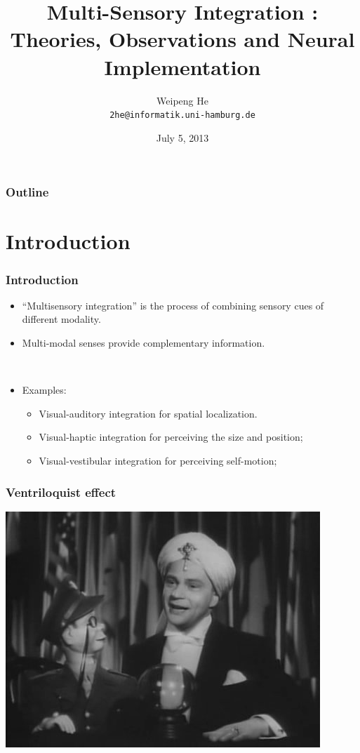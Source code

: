 \documentclass{beamer}
\title{Multi-Sensory Integration : Theories, Observations and Neural Implementation}
\author{Weipeng He \\ \texttt{2he@informatik.uni-hamburg.de}}
\date{July 5, 2013}
\begin{document}
\frame{\titlepage}

\begin{frame}
\frametitle{Outline}
\tableofcontents
\end{frame}

\section{Introduction}
\begin{frame}
  \frametitle{Introduction}
  \begin{itemize}
    \item ``Multisensory integration'' is the process of combining sensory cues of different modality.
    \item Multi-modal senses provide complementary information.

    ~
    \item Examples:
    \begin{itemize}
      \item Visual-auditory integration for spatial localization.
      \item Visual-haptic integration for perceiving the size and position;
      \item Visual-vestibular integration for perceiving self-motion;
    \end{itemize}
  \end{itemize}
\end{frame}

\begin{frame}
  \frametitle{Ventriloquist effect}
  \begin{center}
    \includegraphics[width=.8\textwidth]{ventriloquism}
  \end{center}
\end{frame}
\end{document}
